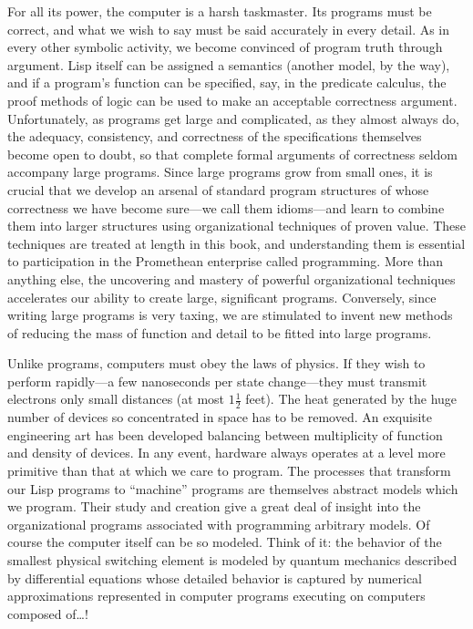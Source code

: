 For all its power, the computer is a harsh taskmaster.
Its programs must be correct, and what we wish to say must be said accurately in every detail.
As in every other symbolic activity, we become convinced of program truth through argument.
Lisp itself can be assigned a semantics (another model, by the way), and if a program’s function can be specified, say, in the predicate calculus, the proof methods of logic can be used to make an acceptable correctness argument.
Unfortunately, as programs get large and complicated, as they almost always do, the adequacy, consistency, and correctness of the specifications themselves become open to doubt, so that complete formal arguments of correctness seldom accompany large programs.
Since large programs grow from small ones, it is crucial that we develop an arsenal of standard program structures of whose correctness we have become sure---we call them idioms---and learn to combine them into larger structures using organizational techniques of proven value.
These techniques are treated at length in this book, and understanding them is essential to participation in the Promethean enterprise called programming.
More than anything else, the uncovering and mastery of powerful organizational techniques accelerates our ability to create large, significant programs.
Conversely, since writing large programs is very taxing, we are stimulated to invent new methods of reducing the mass of function and detail to be fitted into large programs.

Unlike programs, computers must obey the laws of physics.
If they wish to perform rapidly---a few nanoseconds per state change---they must transmit
electrons only small distances (at most \( 1 \frac{1}{2} \) feet).
The heat generated by the huge number of devices so concentrated in space has to be removed.
An exquisite engineering art has been developed balancing between multiplicity of
function and density of devices.
In any event, hardware always operates at a level more primitive than that at which we care to program.
The processes that transform our Lisp programs to “machine” programs are themselves abstract
models which we program.
Their study and creation give a great deal of insight into the organizational programs associated with programming arbitrary models.
Of course the computer itself can be so modeled.
Think of it:
the behavior of the smallest physical switching element is modeled by quantum mechanics
described by differential equations whose detailed behavior is captured by
numerical approximations represented in computer programs executing on
computers composed of…!

